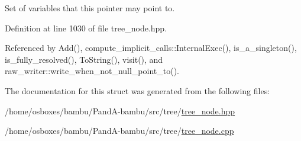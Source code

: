 Set of variables that this pointer may point to. 



Definition at line 1030 of file tree\+\_\+node.\+hpp.



Referenced by Add(), compute\+\_\+implicit\+\_\+calls\+::\+Internal\+Exec(), is\+\_\+a\+\_\+singleton(), is\+\_\+fully\+\_\+resolved(), To\+String(), visit(), and raw\+\_\+writer\+::write\+\_\+when\+\_\+not\+\_\+null\+\_\+point\+\_\+to().



The documentation for this struct was generated from the following files\+:\begin{DoxyCompactItemize}
\item 
/home/osboxes/bambu/\+Pand\+A-\/bambu/src/tree/\hyperlink{tree__node_8hpp}{tree\+\_\+node.\+hpp}\item 
/home/osboxes/bambu/\+Pand\+A-\/bambu/src/tree/\hyperlink{tree__node_8cpp}{tree\+\_\+node.\+cpp}\end{DoxyCompactItemize}
